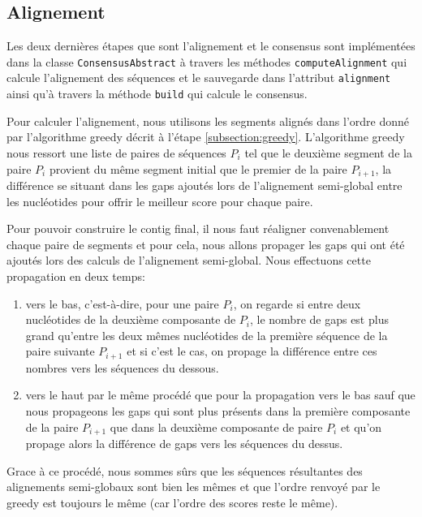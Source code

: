 
\subsection{Alignement}
\label{subsection:alignment}

Les deux dernières étapes que sont l'alignement et le consensus sont
implémentées dans la classe \verb|ConsensusAbstract| à travers les méthodes
\verb|computeAlignment| qui calcule l'alignement des séquences et le sauvegarde
dans l'attribut \verb|alignment| ainsi qu'à travers la méthode \verb|build|
qui calcule le consensus.

Pour calculer l'alignement, nous utilisons les segments alignés dans l'ordre
donné par l'algorithme greedy décrit à l'étape \ref{subsection:greedy}.
L'algorithme greedy nous ressort une liste de paires de séquences $P_{i}$ tel
que le deuxième segment de la paire $P_{i}$ provient du même segment initial que
le premier de la paire $P_{i + 1}$, la différence se situant dans les gaps
ajoutés lors de l'alignement semi-global entre les nucléotides pour offrir le
meilleur score pour chaque paire.

Pour pouvoir construire le contig final, il nous faut réaligner convenablement
chaque paire de segments et pour cela, nous allons propager les gaps qui ont été
ajoutés lors des calculs de l'alignement semi-global. Nous effectuons cette
propagation en deux temps:

\begin{enumerate}
	\item vers le bas, c'est-à-dire, pour une paire $P_{i}$, on regarde si entre
		deux nucléotides de la deuxième composante de $P_{i}$, le
		nombre de gaps est plus grand qu'entre les deux mêmes nucléotides de la première
		séquence de la paire suivante $P_{i + 1}$ et si c'est le cas, on propage la
		différence entre ces nombres vers les séquences du dessous.
	\item vers le haut par le même procédé que pour la propagation vers le bas
		sauf que nous propageons les gaps qui sont plus présents dans la
		première composante de la paire $P_{i + 1}$ que dans la deuxième
		composante de paire $P_{i}$ et qu'on propage alors la différence de gaps
		vers les séquences du dessus.
\end{enumerate}

Grace à ce procédé, nous sommes sûrs que les séquences résultantes des
alignements semi-globaux sont bien les mêmes et que l'ordre renvoyé par le greedy
est toujours le même (car l'ordre des scores reste le même).

